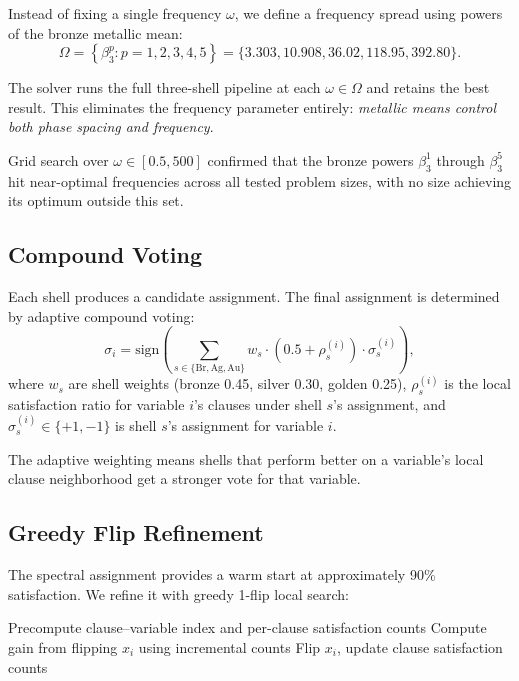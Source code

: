 \documentclass[11pt,a4paper]{article}
\begin{document}
Instead of fixing a single frequency $\omega$, we define a frequency
spread using powers of the bronze metallic mean:
\begin{equation}\label{eq:pendulum}
\Omega = \left\{\beta_3^p : p = 1, 2, 3, 4, 5\right\}
= \{3.303, 10.908, 36.02, 118.95, 392.80\}.
\end{equation}

The solver runs the full three-shell pipeline at each $\omega \in \Omega$
and retains the best result. This eliminates the frequency parameter
entirely: \emph{metallic means control both phase spacing and frequency}.

Grid search over $\omega \in [0.5, 500]$ confirmed that the bronze
powers $\beta_3^1$ through $\beta_3^5$ hit near-optimal frequencies
across all tested problem sizes, with no size achieving its optimum
outside this set.

\subsection{Compound Voting}

Each shell produces a candidate assignment. The final assignment is
determined by adaptive compound voting:
\begin{equation}
\sigma_i = \text{sign}\left(\sum_{s \in \{\text{Br}, \text{Ag}, \text{Au}\}}
w_s \cdot (0.5 + \rho_s^{(i)}) \cdot \sigma_s^{(i)}\right),
\end{equation}
where $w_s$ are shell weights (bronze 0.45, silver 0.30, golden 0.25),
$\rho_s^{(i)}$ is the local satisfaction ratio for variable $i$'s
clauses under shell $s$'s assignment, and $\sigma_s^{(i)} \in \{+1, -1\}$
is shell $s$'s assignment for variable $i$.

The adaptive weighting means shells that perform better on a variable's
local clause neighborhood get a stronger vote for that variable.

\subsection{Greedy Flip Refinement}

The spectral assignment provides a warm start at approximately 90\%
satisfaction. We refine it with greedy 1-flip local search:

\begin{algorithm}[H]
\caption{Incremental Greedy Flip}
\begin{algorithmic}[1]
\State Precompute clause--variable index and per-clause satisfaction counts
    \State Compute gain from flipping $x_i$ using incremental counts
      \State Flip $x_i$, update clause satisfaction counts
    \EndIf
  \EndFor
\EndFor
\end{algorithmic}
\end{algorithm}
\end{document}
